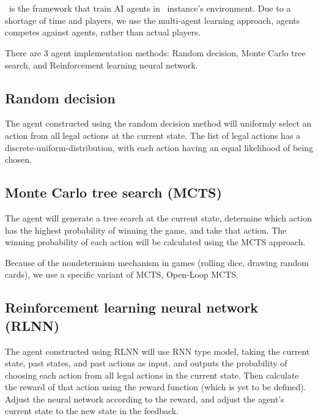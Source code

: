 \section{\RootAI}
\RootAI \ is the framework that train AI agents in \RootOurs \ instance's environment. Due to a shortage of time and players, we use the multi-agent learning approach, agents competes against agents, rather than actual players.

There are 3 agent implementation methods: Random decision, Monte Carlo tree search, and Reinforcement learning neural network.

\subsection{Random decision}
The agent constructed using the random decision method will uniformly select an action from all legal actions at the current state. The list of legal actions has a \gls{discrete-uniform-distribution}, with each action having an equal likelihood of being chosen. %


\subsection{Monte Carlo tree search (MCTS)} %
The agent will generate a tree search at the current state, determine which action has the highest probability of winning the game, and take that action. The winning probability of each action will be calculated using the MCTS approach. 

Because of the nondetermism mechanism in games (rolling dice, drawing random cards), we use a specific variant of MCTS, Open-Loop MCTS.

\subsection{Reinforcement learning neural network (RLNN)} %
The agent constructed using RLNN will use RNN type model, taking the current state, past states, and past actions as input, and outputs the probability of choosing each action from all legal actions in the current state. Then calculate the reward of that action using the reward function (which is yet to be defined). Adjust the neural network according to the reward, and adjust the agent's current state to the new state in the feedback. %


